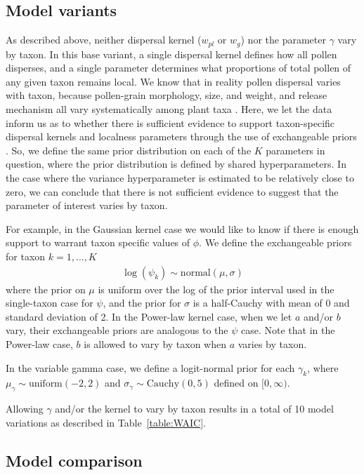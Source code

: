 \documentclass[12pt]{article}
\begin{document}
\subsection{Model variants}

As described above, neither dispersal kernel ($w_{pl}$ or $w_g$) nor
the parameter $\gamma$ vary by taxon. In this base variant, a single
dispersal kernel defines how all pollen disperses, and a single
parameter determines what proportions of total pollen of any given
taxon remains local. We know that in reality pollen dispersal varies
with taxon, because pollen-grain morphology, size, and weight, and
release mechanism all vary systematically among plant taxa
\citep{jackson1999pollen}. Here, we let the data inform us as to
whether there is sufficient evidence to support taxon-specific
dispersal kernels and localness parameters through the use of
exchangeable priors \citep{XXX}. So, we define the same prior
distribution on each of the $K$ parameters in question, where the
prior distribution is defined by shared hyperparameters. In the case
where the variance hyperparameter is estimated to be relatively close
to zero, we can conclude that there is not sufficient evidence to
suggest that the parameter of interest varies by taxon.

For example, in the Gaussian kernel case we would like to know
if there is enough support to warrant taxon specific values of
$\phi$. We define the exchangeable priors for taxon $k=1, \ldots, K$
\begin{align}
\log(\psi_k) \sim \text{normal}( \mu, \sigma)
\end{align}
where the prior on $\mu$ is uniform over the log of the prior interval
used in the single-taxon case for $\psi$, and the prior for $\sigma$
is a half-Cauchy with mean of 0 and standard deviation of 2. In the
Power-law kernel case, when we let $a$ and/or $b$ vary, their
exchangeable priors are analogous to the $\psi$ case. Note that in the
Power-law case, $b$ is allowed to vary by taxon when $a$ varies by taxon.

In the variable gamma case, we define a logit-normal prior for each
$\gamma_k$, where $\mu_{\gamma} \sim \text{uniform}(-2, 2)$ and $\sigma_{\gamma}
\sim \text{Cauchy}(0,5)$ defined on $[0,\infty)$.

Allowing $\gamma$ and/or the kernel to vary by taxon results in a
total of 10 model variations as described in Table~\ref{table:WAIC}.

\subsection{Model comparison}
\end{document}
